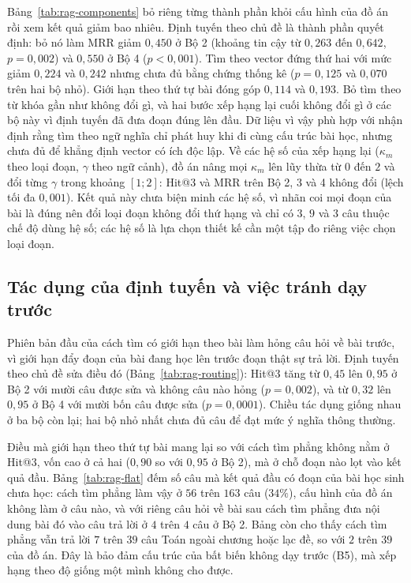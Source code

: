 Bảng~\ref{tab:rag-components} bỏ riêng từng thành phần khỏi cấu hình của đồ án rồi xem kết quả giảm bao nhiêu. Định tuyến theo chủ đề là thành phần quyết định: bỏ nó làm MRR giảm $0{,}450$ ở Bộ 2 (khoảng tin cậy từ $0{,}263$ đến $0{,}642$, $p=0{,}002$) và $0{,}550$ ở Bộ 4 ($p<0{,}001$). Tìm theo vector đứng thứ hai với mức giảm $0{,}224$ và $0{,}242$ nhưng chưa đủ bằng chứng thống kê ($p=0{,}125$ và $0{,}070$ trên hai bộ nhỏ). Giới hạn theo thứ tự bài đóng góp $0{,}114$ và $0{,}193$. Bỏ tìm theo từ khóa gần như không đổi gì, và hai bước xếp hạng lại cuối không đổi gì ở các bộ này vì định tuyến đã đưa đoạn đúng lên đầu. Dữ liệu vì vậy phù hợp với nhận định rằng tìm theo ngữ nghĩa chỉ phát huy khi đi cùng cấu trúc bài học, nhưng chưa đủ để khẳng định vector có ích độc lập. Về các hệ số của xếp hạng lại ($\kappa_m$ theo loại đoạn, $\gamma$ theo ngữ cảnh), đồ án nâng mọi $\kappa_m$ lên lũy thừa từ $0$ đến $2$ và đổi từng $\gamma$ trong khoảng $[1;2]$: Hit@3 và MRR trên Bộ 2, 3 và 4 không đổi (lệch tối đa $0{,}001$). Kết quả này chưa biện minh các hệ số, vì nhãn coi mọi đoạn của bài là đúng nên đổi loại đoạn không đổi thứ hạng và chỉ có $3$, $9$ và $3$ câu thuộc chế độ dùng hệ số; các hệ số là lựa chọn thiết kế cần một tập đo riêng việc chọn loại đoạn.



\subsection{Tác dụng của định tuyến và việc tránh dạy trước}
Phiên bản đầu của cách tìm có giới hạn theo bài làm hỏng câu hỏi về bài trước, vì giới hạn đẩy đoạn của bài đang học lên trước đoạn thật sự trả lời. Định tuyến theo chủ đề sửa điều đó (Bảng~\ref{tab:rag-routing}): Hit@3 tăng từ $0{,}45$ lên $0{,}95$ ở Bộ 2 với mười câu được sửa và không câu nào hỏng ($p=0{,}002$), và từ $0{,}32$ lên $0{,}95$ ở Bộ 4 với mười bốn câu được sửa ($p=0{,}0001$). Chiều tác dụng giống nhau ở ba bộ còn lại; hai bộ nhỏ nhất chưa đủ câu để đạt mức ý nghĩa thông thường.



Điều mà giới hạn theo thứ tự bài mang lại so với cách tìm phẳng không nằm ở Hit@3, vốn cao ở cả hai ($0{,}90$ so với $0{,}95$ ở Bộ 2), mà ở chỗ đoạn nào lọt vào kết quả đầu. Bảng~\ref{tab:rag-flat} đếm số câu mà kết quả đầu có đoạn của bài học sinh chưa học: cách tìm phẳng làm vậy ở $56$ trên $163$ câu ($34\%$), cấu hình của đồ án không làm ở câu nào, và với riêng câu hỏi về bài sau cách tìm phẳng đưa nội dung bài đó vào câu trả lời ở $4$ trên $4$ câu ở Bộ 2. Bảng còn cho thấy cách tìm phẳng vẫn trả lời $7$ trên $39$ câu Toán ngoài chương hoặc lạc đề, so với $2$ trên $39$ của đồ án. Đây là bảo đảm cấu trúc của bất biến không dạy trước (B5), mà xếp hạng theo độ giống một mình không cho được.

